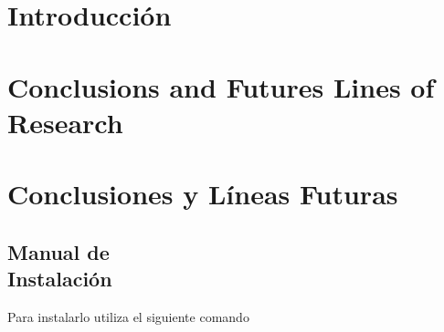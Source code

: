 \documentclass[12pt, a4paper, twoside]{article}
\begin{document}


\clearpage
\setcounter{page}{1}



\newpage



\newpage



\tableofcontents

\section{Introducción}


\section{Conclusions and Futures Lines of Research}


\section{Conclusiones y Líneas Futuras}


\printbibliography
\newpage

\begin{umaappendices}
  \section{Manual de \\ Instalación}
  Para instalarlo utiliza el siguiente comando

\end{umaappendices}


\end{document}
